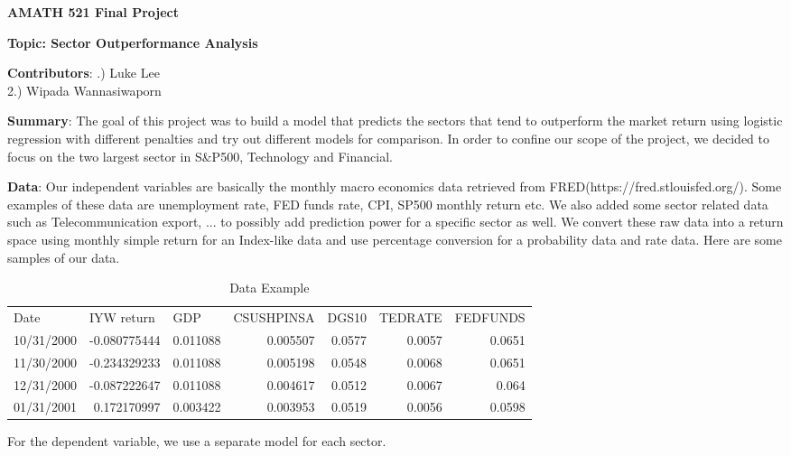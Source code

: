 \documentclass[12pt]{amsart}
\begin{document}
{\bf \Large AMATH 521 Final Project}\\
\begin{center}
{\bf \Large Topic: Sector Outperformance Analysis}\\
\end{center}
\vskip 16pt \noindent
{\textbf{Contributors}: }
\vskip 8pt .) Luke Lee\\
2.) Wipada Wannasiwaporn

\vskip 8pt \noindent
{\textbf{Summary}: }
\vskip 8pt \noindent
The goal of this project was to build a model that predicts the sectors that tend to outperform the market return using logistic regression with different penalties and try out different models for comparison. In order to confine our scope of the project, we decided to focus on the two largest sector in S\&P500, Technology and Financial. 

\vskip 8pt \noindent
{\textbf{Data}: }
\vskip 8pt \noindent
Our independent variables are basically the monthly macro economics data retrieved from FRED(https://fred.stlouisfed.org/). Some examples of these data are unemployment 
rate, FED funds rate, CPI, SP500 monthly return etc. We also added some sector related data such as Telecommunication export, ... to possibly add prediction power for a specific sector as well. We convert these raw data into a return space using monthly simple return for an Index-like data and use percentage conversion for a probability data and rate data. Here are some samples of our data.\\

\begin{table}[htbp]
	\centering
	\caption{Data Example}
	\begin{tabular}{rrrrrrr}
		\multicolumn{1}{l}{Date} & \multicolumn{1}{l}{IYW return} & \multicolumn{1}{l}{GDP} & \multicolumn{1}{l}{CSUSHPINSA} & \multicolumn{1}{l}{DGS10} & \multicolumn{1}{l}{TEDRATE} & \multicolumn{1}{l}{FEDFUNDS} \\
		10/31/2000 & -0.080775444 & 0.011088 & 0.005507 & 0.0577 & 0.0057 & 0.0651 \\
		11/30/2000 & -0.234329233 & 0.011088 & 0.005198 & 0.0548 & 0.0068 & 0.0651 \\
		12/31/2000 & -0.087222647 & 0.011088 & 0.004617 & 0.0512 & 0.0067 & 0.064 \\
		01/31/2001 & 0.172170997 & 0.003422 & 0.003953 & 0.0519 & 0.0056 & 0.0598 \\
	\end{tabular}%
	\label{tab:addlabel}%
\end{table}%
\vskip 8pt \noindent
For the dependent variable, we use a separate model for each sector.\\
\end{document}
